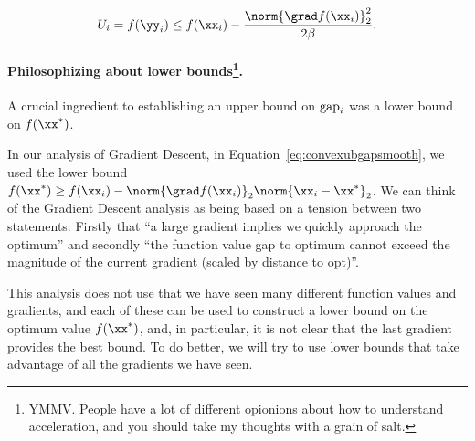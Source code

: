\begin{equation}
 U_i = f(\yy_i) \leq  f(\xx_{i})
 - \frac{\norm{\grad  f(\xx_{i})}_2^2}{2\beta}
 .\label{eq:agdub}
\end{equation}
\paragraph{Philosophizing about lower bounds\protect\footnote{YMMV. People
   have a lot of different opionions about how to understand acceleration, and you should take my thoughts with a grain of salt.}.}
A crucial ingredient to establishing an upper bound on $\text{gap}_i $ was a
lower bound on $f(\xx^*)$.

In our analysis of Gradient Descent, in Equation~\eqref{eq:convexubgapsmooth}, we used the
lower bound ${f(\xx^*) \geq f(\xx_i) - \norm{\grad f(\xx_{i})}_2 \norm{\xx_i - \xx^*}_2 }$.
%
We can think of the Gradient Descent analysis as being based on a
tension between two statements: Firstly that ``a large gradient implies we quickly approach
the optimum'' and secondly ``the function value gap to optimum cannot exceed the magnitude of
the current gradient (scaled by distance to opt)''.

This analysis does not use that we have seen many different
function values and gradients, and each of these can be used to
construct a lower bound on the optimum value $f(\xx^*)$, and, in
particular, it is not clear that the last gradient provides the best bound.
To do better, we will try to use lower bounds that take advantage of
all the gradients we have seen.

%
